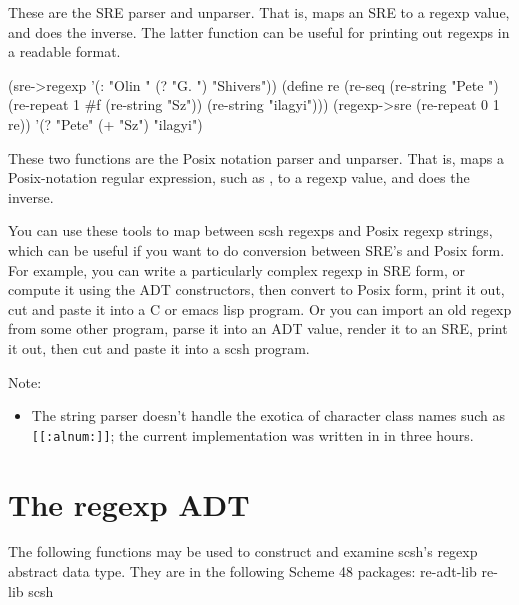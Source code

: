 \begin{desc}
These are the SRE parser and unparser.
That is,  maps an SRE to a regexp value, and
 does the inverse.
The latter function can be useful for printing out regexps in a
readable format.

\begin{widecode}
(sre->regexp '(: "Olin " (? "G. ") "Shivers")) {\evalto} 
(define re (re-seq (re-string "Pete ")
                   (re-repeat 1 #f (re-string "Sz"))
                   (re-string "ilagyi")))
(regexp->sre (re-repeat 0 1 re)) 
    {\evalto} '(? "Pete" (+ "Sz") "ilagyi")\end{widecode}
                     
\end{desc}

\begin{desc}
These two functions are the Posix notation parser and unparser.
That is,  maps a Posix-notation regular
expression, such as , to a regexp value, and 
 does the inverse.

You can use these tools to map between scsh regexps and Posix
regexp strings, which can be useful if you want to do conversion
between SRE's and Posix form. For example, you can write a particularly
complex regexp in SRE form, or compute it using the ADT constructors,
then convert to Posix form, print it out, cut and paste it into a
C or emacs lisp program. Or you can import an old regexp from some other
program, parse it into an ADT value, render it to an SRE, print it out, 
then cut and paste it into a scsh program.

Note:\begin{itemize}
\item The string parser doesn't handle the exotica of character class
      names such as \verb|[[:alnum:]]|; the current implementation was written
      in in three hours.
\end{itemize}
\end{desc}

\section{The regexp ADT}
The following functions may be used to construct and examine scsh's
regexp abstract data type. They are in the following Scheme 48 packages:
    re-adt-lib
    re-lib
    scsh

